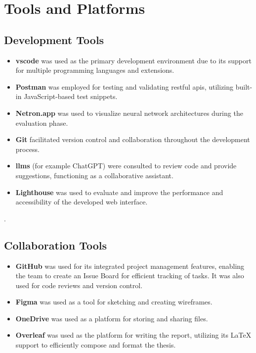 \section{Tools and Platforms}
\label{sec:tools-and-platforms}

\subsection*{Development Tools}
\label{subsec:development-tools}

\begin{itemize}
    \item \textbf{\acrlong{vscode}} was used as the primary development environment due to its support for multiple programming languages and extensions.
\item \textbf{Postman} was employed for testing and validating \acrshort{rest}ful \glspl{api}, utilizing built-in JavaScript-based test snippets.
\item \textbf{Netron.app} was used to visualize neural network architectures during the evaluation phase.
\item \textbf{Git} facilitated version control and collaboration throughout the development process.
\item \textbf{\glspl{llm}} (for example ChatGPT) were consulted to review code and provide suggestions, functioning as a collaborative assistant.
\item \textbf{Lighthouse} was used to evaluate and improve the performance and accessibility of the developed web interface.
\end{itemize}.

\subsection*{Collaboration Tools}
\label{subsec:collaboration-and-design-tools}

\begin{itemize}
    \item \textbf{GitHub} was used for its integrated project management features, enabling the team to create an Issue Board for efficient tracking of tasks. It was also used for code reviews and version control.

    
    
    \item \textbf{Figma} was used as a tool for sketching and creating wireframes.
    
    \item \textbf{OneDrive} was used as a platform for storing and sharing files.
    
    \item \textbf{Overleaf} was used as the platform for writing the report, utilizing its LaTeX support to efficiently compose and format the thesis.
\end{itemize}

